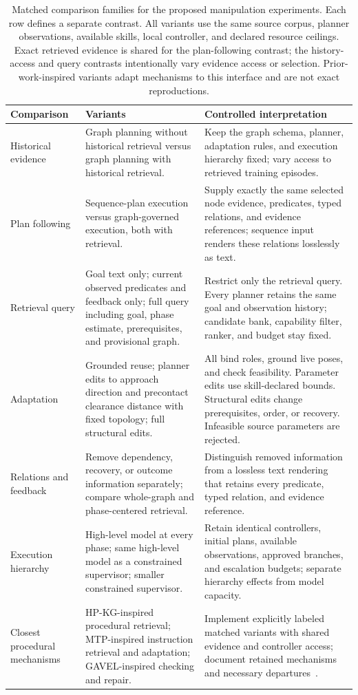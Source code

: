 \documentclass[10pt,twocolumn,letterpaper]{article}
\begin{document}
\begin{table}[t]
\centering
\small
\caption{Matched comparison families for the proposed manipulation experiments. Each row defines a separate contrast. All variants use the same source corpus, planner observations, available skills, local controller, and declared resource ceilings. Exact retrieved evidence is shared for the plan-following contrast; the history-access and query contrasts intentionally vary evidence access or selection. Prior-work-inspired variants adapt mechanisms to this interface and are not exact reproductions.}
\label{tab:comparison-design}
\begin{tabularx}{\textwidth}{@{}p{}XX@{}}
\toprule
Comparison & Variants & Controlled interpretation \\
\midrule
Historical evidence & Graph planning without historical retrieval versus graph planning with historical retrieval. & Keep the graph schema, planner, adaptation rules, and execution hierarchy fixed; vary access to retrieved training episodes. \\
Plan following & Sequence-plan execution versus graph-governed execution, both with retrieval. & Supply exactly the same selected node evidence, predicates, typed relations, and evidence references; sequence input renders these relations losslessly as text. \\
Retrieval query & Goal text only; current observed predicates and feedback only; full query including goal, phase estimate, prerequisites, and provisional graph. & Restrict only the retrieval query. Every planner retains the same goal and observation history; candidate bank, capability filter, ranker, and budget stay fixed. \\
Adaptation & Grounded reuse; planner edits to approach direction and precontact clearance distance with fixed topology; full structural edits. & All bind roles, ground live poses, and check feasibility. Parameter edits use skill-declared bounds. Structural edits change prerequisites, order, or recovery. Infeasible source parameters are rejected. \\
Relations and feedback & Remove dependency, recovery, or outcome information separately; compare whole-graph and phase-centered retrieval. & Distinguish removed information from a lossless text rendering that retains every predicate, typed relation, and evidence reference. \\
Execution hierarchy & High-level model at every phase; same high-level model as a constrained supervisor; smaller constrained supervisor. & Retain identical controllers, initial plans, available observations, approved branches, and escalation budgets; separate hierarchy effects from model capacity. \\
Closest procedural mechanisms & HP-KG-inspired procedural retrieval; MTP-inspired instruction retrieval and adaptation; GAVEL-inspired checking and repair. & Implement explicitly labeled matched variants with shared evidence and controller access; document retained mechanisms and necessary departures~\cite{hpkg2025,mtp2025,gavel2026}. \\
\bottomrule
\end{tabularx}
\end{table}
\end{document}
